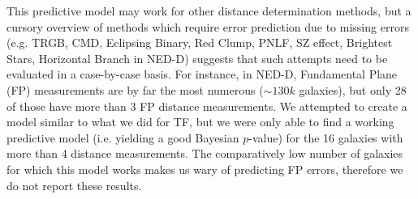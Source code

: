 \documentclass[a4paper,fleqn,usenatbib]{mnras}
\begin{document}
This predictive model may work for other distance determination methods, but a cursory overview of methods which require error prediction due to missing errors (e.g. TRGB, CMD, Eclipsing Binary, Red Clump, PNLF, SZ effect, Brightest Stars, Horizontal Branch in NED-D) suggests that such attempts need to be evaluated in a case-by-case basis. For instance, in NED-D, Fundamental Plane (FP) measurements are by far the most numerous ($\sim130k$ galaxies), but only 28 of those have more than 3 FP distance measurements. We attempted to create a model similar to what we did for TF, but we were only able to find a working predictive model (i.e. yielding a good Bayesian $p$-value) for the 16 galaxies with more than 4 distance measurements. The comparatively low number of galaxies for which this model works makes us wary of predicting FP errors, therefore we do not report these results.
\end{document}
